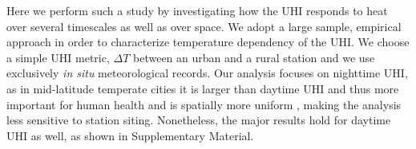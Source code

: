 \documentclass[12pt]{iopart}
\begin{document}

Here we perform such a study by investigating how the UHI responds to heat over several timescales as well as over space. We adopt a large sample, empirical approach in order to characterize temperature dependency of the UHI. We choose a simple UHI metric, $\Delta T$ between an urban and a rural station
and we use exclusively \textit{in situ} meteorological records. Our analysis focuses on nighttime UHI, as in mid-latitude temperate cities it is larger than daytime UHI \cite{oke1982energetic} and thus more important for human health \cite{kovats2008heat} and is spatially more uniform \cite{scott2016intra}, making the analysis less sensitive to station siting.  Nonetheless, the major results hold for daytime UHI as well, as shown in Supplementary Material. 
\end{document}
